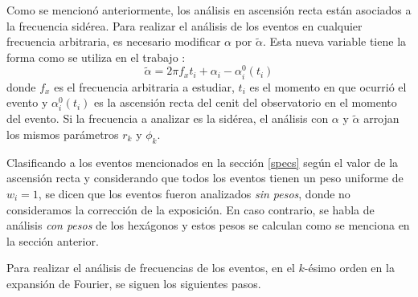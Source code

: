   Como se mencionó anteriormente, los análisis en ascensión recta están asociados a la frecuencia sidérea. Para realizar el análisis de los eventos en cualquier frecuencia arbitraria, es necesario modificar $\alpha$ por $\tilde{\alpha}$. Esta nueva variable tiene la forma como se utiliza en el trabajo \cite{taborda}:
  \begin{equation}
    \tilde{\alpha} = 2\pi f_x t_i + \alpha_i - \alpha_i^0(t_i) \label{ra_mod}
  \end{equation}
  donde $f_x$ es el frecuencia arbitraria a estudiar, $t_i$ es el momento en que ocurrió el evento y $\alpha_i^0(t_i)$ es la ascensión recta del cenit del observatorio en el momento del evento. Si la frecuencia a analizar es la sidérea, el análisis con $\alpha$ y $\tilde{\alpha}$ arrojan los mismos parámetros $r_k$ y $\phi_k$.

 Clasificando a los eventos mencionados en la sección \ref{specs} según el valor de la ascensión recta y considerando que todos los eventos tienen un peso uniforme de $w_i=1$, se dicen que los eventos fueron analizados \textit{sin pesos}, donde no consideramos la corrección de la exposición. En caso contrario, se habla de análisis \textit{con pesos} de los hexágonos  y estos pesos se calculan como se menciona en la sección anterior.

  Para realizar el análisis de frecuencias de los eventos, en el $k$-ésimo orden en la expansión de Fourier, se siguen los siguientes pasos.

